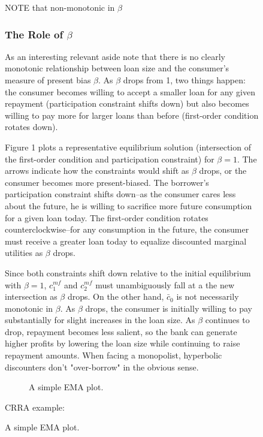 \documentclass[11pt]{article}%
\begin{document}
\begin{figure}
{NOTE that non-monotonic in $\beta$


\subsubsection{The Role of $\beta$}

As an interesting relevant aside note that there is no clearly monotonic
relationship between loan size and the consumer's measure of present bias
$\beta$. As $\beta$ drops from 1, two things happen: the consumer becomes
willing to accept a smaller loan for any given repayment (participation
constraint shifts down) but also becomes willing to pay more for larger loans
than before (first-order condition rotates down).

Figure 1 plots a representative equilibrium solution (intersection of the
first-order condition and participation constraint) for $\beta=1$. The arrows
indicate how the constraints would shift as $\beta$ drops, or the consumer
becomes more present-biased. The borrower's participation constraint shifts
down--as the consumer cares less about the future, he is willing to sacrifice
more future consumption for a given loan today. The first-order condition
rotates counterclockwise--for any consumption in the future, the consumer must
receive a greater loan today to equalize discounted marginal utilities as
$\beta$ drops.

Since both constraints shift down relative to the initial equilibrium with
$\beta=1$, $c_{1}^{mf}$ and $c_{2}^{mf}$ must unambiguously fall at a the new
intersection as $\beta$ drops. On the other hand, $\bar{c}_{0}$ is not
necessarily monotonic in $\beta$. As $\beta$ drops, the consumer is initially
willing to pay substantially for slight increases in the loan size. As $\beta$
continues to drop, repayment becomes less salient, so the bank can generate
higher profits by lowering the loan size while continuing to raise repayment
amounts. When facing a monopolist, hyperbolic discounters don't "over-borrow"
in the obvious sense.

\begin{figure}
        \caption{A simple EMA plot.\label{fig:ema1}}
        \centering
        
    \end{figure}

CRRA example:%

}
\end{figure}
\end{document}
